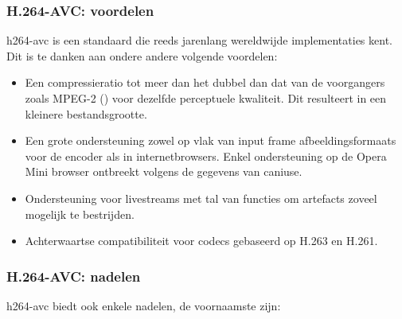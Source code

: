 \subsubsection{H.264-AVC: voordelen}
\label{sec:videocompressie-h264-AVC-voordelen}

\Gls{h264-avc} is een standaard die reeds jarenlang wereldwijde implementaties kent. Dit is te danken aan ondere andere volgende voordelen:

\begin{itemize}
	
	\item Een \gls{compressieratio} tot meer dan het dubbel dan dat van de voorgangers zoals MPEG-2 (\cite{h264avcmpeg2kwaliteit}) voor dezelfde perceptuele kwaliteit. Dit resulteert in een kleinere bestandsgrootte.
	
	\item Een grote ondersteuning zowel op vlak van input \gls{frame} \glspl{afbeeldingsformaat} voor de \gls{encoder} als in internetbrowsers. Enkel ondersteuning op de Opera Mini browser ontbreekt volgens de gegevens van caniuse.
	
	\item Ondersteuning voor livestreams met tal van functies om \glspl{artefact} zoveel mogelijk te bestrijden.
	
	\item Achterwaartse compatibiliteit voor \glspl{codec} gebaseerd op H.263 en H.261.
	
\end{itemize}

\subsubsection{H.264-AVC: nadelen}
\label{sec:videocompressie-h264-AVC-nadelen}

\Gls{h264-avc} biedt ook enkele nadelen, de voornaamste zijn:

